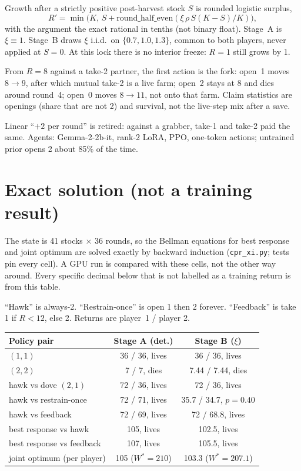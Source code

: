 \documentclass[11pt,a4paper]{article}
\begin{document}
Growth after a strictly positive post-harvest stock \(S\) is rounded logistic surplus,
\[
  R'=\min\bigl(K,\,S+\mathrm{round\_half\_even}(\xi\,\rho\,S(K-S)/K)\bigr),
\]
with the argument the exact rational in tenths (not binary float).
Stage~A is \(\xi\equiv 1\).
Stage~B draws \(\xi\) i.i.d.\ on \(\{0.7,1.0,1.3\}\), common to both players, never applied at \(S=0\).
At this lock there is no interior freeze: \(R=1\) still grows by 1.

From \(R=8\) against a take-2 partner, the first action is the fork:
open~1 moves \(8\to 9\), after which mutual take-2 is a live farm;
open~2 stays at 8 and dies around round~4;
open~0 moves \(8\to 11\), not onto that farm.
Claim statistics are openings (share that are not 2) and survival, not the live-step mix after a save.

Linear ``\(+2\) per round'' is retired: against a grabber, take-1 and take-2 paid the same.
Agents: Gemma-2-2b-it, rank-2 LoRA, PPO, one-token actions; untrained prior opens 2 about 85\% of the time.

\section*{Exact solution (not a training result)}
The state is 41 stocks \(\times\) 36 rounds, so the Bellman equations for best response and joint optimum are solved exactly by backward induction (\texttt{cpr\_xi.py}; tests pin every cell).
A GPU run is compared with these cells, not the other way around.
Every specific decimal below that is not labelled as a training return is from this table.

``Hawk'' is always-2.
``Restrain-once'' is open 1 then 2 forever.
``Feedback'' is take 1 if \(R<12\), else 2.
Returns are player~1 / player 2.

\begin{center}
\small\vspace{-0.4em}
\begin{tabular}{@{}lcc@{}}
\toprule
Policy pair & Stage A (det.) & Stage B (\(\xi\)) \\
\midrule
\((1,1)\) & 36 / 36, lives & 36 / 36, lives \\
\((2,2)\) & 7 / 7, dies & 7.44 / 7.44, dies \\
hawk vs dove \((2,1)\) & 72 / 36, lives & 72 / 36, lives \\
hawk vs restrain-once & 72 / 71, lives & 35.7 / 34.7, \(p=0.40\) \\
hawk vs feedback & 72 / 69, lives & 72 / 68.8, lives \\
best response vs hawk & 105, lives & 102.5, lives \\
best response vs feedback & 107, lives & 105.5, lives \\
joint optimum (per player) & 105 (\(W^{*}=210\)) & 103.3 (\(W^{*}=207.1\)) \\
\bottomrule
\end{tabular}
\end{center}
\end{document}
